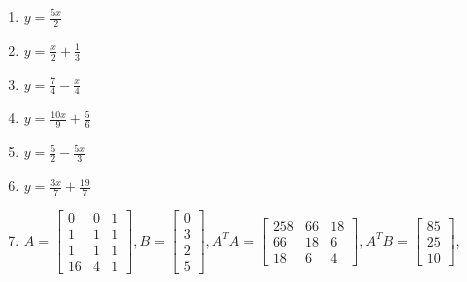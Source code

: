 \documentclass[10pt]{amsart}
\begin{document}
\begin{multicols}{2}
\begin{enumerate}
\item $y=\frac{5 x}{2}$
\item $y=\frac{x}{2}+\frac{1}{3}$
\item $y=\frac{7}{4}-\frac{x}{4}$
\item $y=\frac{10 x}{9}+\frac{5}{6}$
\item $y=\frac{5}{2}-\frac{5 x}{3}$
\item $y=\frac{3 x}{7}+\frac{19}{7}$
\item 
$
A=
\begin{bmatrix} 
 0 & 0 & 1 \\
 1 & 1 & 1 \\
 1 & 1 & 1 \\
 16 & 4 & 1
\end{bmatrix},
B=
\begin{bmatrix} 
 0 \\
 3 \\
 2 \\
 5
\end{bmatrix},
A^T A=
\begin{bmatrix} 
 258 & 66 & 18 \\
 66 & 18 & 6 \\
 18 & 6 & 4
\end{bmatrix},
A^T B=
\begin{bmatrix} 
 85 \\
 25 \\
 10
\end{bmatrix}$,


\end{enumerate}
\end{multicols}
\end{document}
